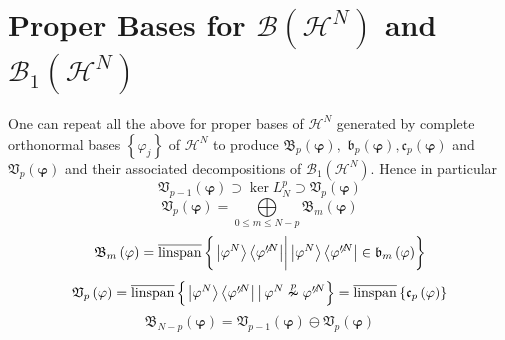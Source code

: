 \documentclass[aps,preprint]{revtex4}%
\begin{document}
\section{Proper Bases for $\mathcal{B}\left(  \mathcal{H}^{N}\right)  $ and
$\mathcal{B}_{1}\left(  \mathcal{H}^{N}\right)  $}

One can repeat all the above for proper bases of $\mathcal{H}^{N}$ generated
by complete orthonormal bases $\left\{  \varphi_{j}\right\}  $ of
$\mathcal{H}^{N}$ to produce $\mathfrak{B}_{p}\left(  \mathbf{\varphi}\right)
,$ $\mathfrak{b}_{p}\left(  \mathbf{\varphi}\right)  ,\mathfrak{c}_{p}\left(
\mathbf{\varphi}\right)  $ and $\mathfrak{V}_{p}\left(  \mathbf{\varphi
}\right)  $ and their associated decompositions of $\mathcal{B}_{1}\left(
\mathcal{H}^{N}\right)  .$ Hence in particular
\begin{equation}
\mathfrak{V}_{p-1}\left(  \mathbf{\varphi}\right)  \supset\ker L_{N}%
^{p}\supset\mathfrak{V}_{p}\left(  \mathbf{\varphi}\right)
\end{equation}%
\begin{equation}
\mathfrak{V}_{p}\left(  \mathbf{\varphi}\right)  =%
{\displaystyle\bigoplus\limits_{0\leq m\leq N-p}}
\mathfrak{B}_{m}\left(  \mathbf{\varphi}\right)
\end{equation}%
\begin{equation}
\mathfrak{B}_{m}\left(  \mathbf{\varphi}\right)  =\overline
{\operatorname{linspan}}\left\{  \left.  \underset{}{\left\vert
\mathbf{\varphi}^{N}\right\rangle \left\langle \mathbf{\varphi}^{\not \prime
N}\right\vert }\right\vert \left\vert \mathbf{\varphi}^{N}\right\rangle
\left\langle \mathbf{\varphi}^{\not \prime N}\right\vert \in\mathfrak{b}%
_{m}\left(  \mathbf{\varphi}\right)  \right\}
\end{equation}%
\begin{equation}
\mathfrak{V}_{p}\left(  \mathbf{\varphi}\right)  =\overline
{\operatorname{linspan}}\left\{  \left.  \left\vert \mathbf{\varphi}%
^{N}\right\rangle \left\langle \mathbf{\varphi}^{\not \prime N}\right\vert
\overset{}{}\right\vert \mathbf{\varphi}^{N}\overset{p}{\nsim}\mathbf{\varphi
}^{\not \prime N}\right\}  =\overline{\operatorname{linspan}}\left\{
\mathfrak{c}_{p}\left(  \mathbf{\varphi}\right)  \right\}
\end{equation}%
\begin{equation}
\mathfrak{B}_{N-p}\left(  \mathbf{\varphi}\right)  =\mathfrak{V}_{p-1}\left(
\mathbf{\varphi}\right)  \ominus\mathfrak{V}_{p}\left(  \mathbf{\varphi
}\right)
\end{equation}
\end{document}
